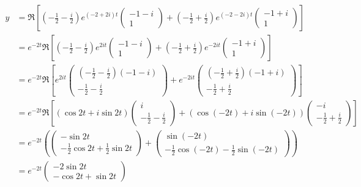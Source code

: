 \documentclass[11pt]{article}
\begin{document}
\begin{align*}
y &= \Re \left[ \left(-\frac{1}{2}-\frac{i}{2} \right) e^{(-2 + 2i)t}  \left( \begin{matrix} -1-i \\ 1 \end{matrix} \right) + \left( -\frac{1}{2}+\frac{i}{2}\right) e^{(-2 - 2i)t}  \left( \begin{matrix} -1+i \\1 \end{matrix} \right) \right]\\
&= e^{-2t} \Re \left[ \left(-\frac{1}{2}-\frac{i}{2} \right) e^{ 2it}  \left( \begin{matrix} -1-i \\ 1 \end{matrix} \right) + \left( -\frac{1}{2}+\frac{i}{2}\right) e^{- 2it}  \left( \begin{matrix} -1+i \\1 \end{matrix} \right) \right]\\
&= e^{-2t} \Re \left[  e^{ 2it}  \left( \begin{matrix} \left(-\frac{1}{2}-\frac{i}{2} \right)(-1-i) \\ -\frac{1}{2}-\frac{i}{2} \end{matrix} \right) +  e^{- 2it}  \left( \begin{matrix}\left( -\frac{1}{2}+\frac{i}{2}\right)( -1+i) \\  -\frac{1}{2}+\frac{i}{2} \end{matrix} \right) \right]\\
&= e^{-2t} \Re \left[ (\cos 2t + i \sin 2t ) \left( \begin{matrix} i\\ -\frac{1}{2}-\frac{i}{2} \end{matrix} \right) +  (\cos(-2t) + i \sin(-2t))  \left( \begin{matrix} -i \\  -\frac{1}{2}+\frac{i}{2} \end{matrix} \right) \right]\\
&= e^{-2t} \left(  \left( \begin{matrix} -\sin 2t\\ -\frac{1}{2}\cos 2t +\frac{1}{2} \sin 2t \end{matrix} \right) +   \left( \begin{matrix}\sin(-2t)  \\  -\frac{1}{2} \cos(-2t) -\frac{1}{2} \sin(-2t) \end{matrix} \right) \right) \\
&= e^{-2t}  \left( \begin{matrix} -2 \sin 2t \\ -\cos 2t + \sin 2t \end{matrix} \right)  \\
\end{align*}
\end{document}
